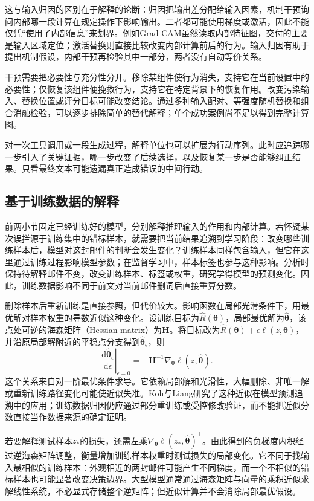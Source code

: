 这与输入归因的区别在于解释的论断：归因把输出差分配给输入因素，机制干预询问内部哪一段计算在规定操作下影响输出。二者都可能使用梯度或激活，因此不能仅凭“使用了内部信息”来划界。例如Grad-CAM虽然读取内部特征图，交付的主要是输入区域定位；激活替换则直接比较改变内部计算前后的行为。输入归因有助于提出机制假设，内部干预再检验其中一部分，两者没有自动等价关系。

干预需要把必要性与充分性分开。移除某组件使行为消失，支持它在当前设置中的必要性；仅恢复该组件便挽救行为，支持它在特定背景下的恢复作用。改变污染输入、替换位置或评分目标可能改变结论。通过多种输入配对、等强度随机替换和组合消融检验，可以逐步排除简单的替代解释；单个成功案例尚不足以得到完整计算图。

对一次工具调用或一段生成过程，解释单位也可以扩展为行动序列。此时应追踪哪一步引入了关键证据，哪一步改变了后续选择，以及恢复某一步是否能够纠正结果。只看最终文本可能遗漏真正造成错误的中间行动。

\subsection{基于训练数据的解释}
\label{sec:interpretability-local-training}

前两小节固定已经训练好的模型，分别解释推理输入的作用和内部计算。若怀疑某次误拦源于训练集中的错标样本，就需要把当前结果追溯到学习阶段：改变哪些训练样本后，模型对这封邮件的判断会发生变化？训练样本同样包含输入，但它在这里通过训练过程影响模型参数；在监督学习中，样本标签也参与这种影响。分析时保持待解释邮件不变，改变训练样本、标签或权重，研究学得模型的预测变化。因此，训练数据影响不同于前文对当前邮件删词后直接重算分数。

删除样本后重新训练是直接参照，但代价较大。影响函数在局部光滑条件下，用最优解对样本权重的导数近似这种变化。设训练目标为$\hat R(\bm{\theta})$，局部最优解为$\hat{\bm{\theta}}$，该点处可逆的海森矩阵（Hessian matrix）为$\bm H$。将目标改为$\hat R(\bm{\theta})+\epsilon\ell(z,\bm{\theta})$，并沿原局部解附近的平稳点分支得到$\hat{\bm{\theta}}_\epsilon$，则
\[
 \left.\frac{\mathrm d\hat{\bm{\theta}}_\epsilon}
 {\mathrm d\epsilon}\right|_{\epsilon=0}
 =-\bm H^{-1}\nabla_{\bm{\theta}}
       \ell(z,\hat{\bm{\theta}}).
\]
这个关系来自对一阶最优条件求导。它依赖局部解和光滑性，大幅删除、非唯一解或重新训练路径变化可能使近似失准。Koh与Liang研究了这种近似在模型预测追溯中的应用；训练数据归因仍应通过部分重训练或受控修改验证，而不能把近似分数直接当作数据来源的确定证明。

若要解释测试样本$z_*$的损失，还需左乘$\nabla_{\bm\theta}\ell(z_*,\hat{\bm\theta})^\top$。由此得到的负梯度内积经过逆海森矩阵调整，衡量增加训练样本权重时测试损失的局部变化。它不同于找输入最相似的训练样本：外观相近的两封邮件可能产生不同梯度，而一个不相似的错标样本也可能显著改变决策边界。大型模型通常通过海森矩阵与向量的乘积近似求解线性系统，不必显式存储整个逆矩阵；但近似计算并不会消除局部最优假设。

